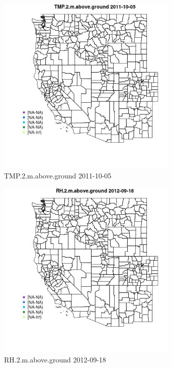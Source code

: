 \begin{figure} 
\centering  
\includegraphics[width=0.77\textwidth]{Code_Outputs/ML_input_report_ML_input_PM25_Step5_part_d_de_duplicated_aves_ML_input_MapObsTMP2maboveground2011-10-05.jpg} 
\caption{\label{fig:ML_input_report_ML_input_PM25_Step5_part_d_de_duplicated_aves_ML_inputMapObsTMP2maboveground2011-10-05}TMP.2.m.above.ground 2011-10-05} 
\end{figure} 
 

\begin{figure} 
\centering  
\includegraphics[width=0.77\textwidth]{Code_Outputs/ML_input_report_ML_input_PM25_Step5_part_d_de_duplicated_aves_ML_input_MapObsRH2maboveground2012-09-18.jpg} 
\caption{\label{fig:ML_input_report_ML_input_PM25_Step5_part_d_de_duplicated_aves_ML_inputMapObsRH2maboveground2012-09-18}RH.2.m.above.ground 2012-09-18} 
\end{figure} 
 

